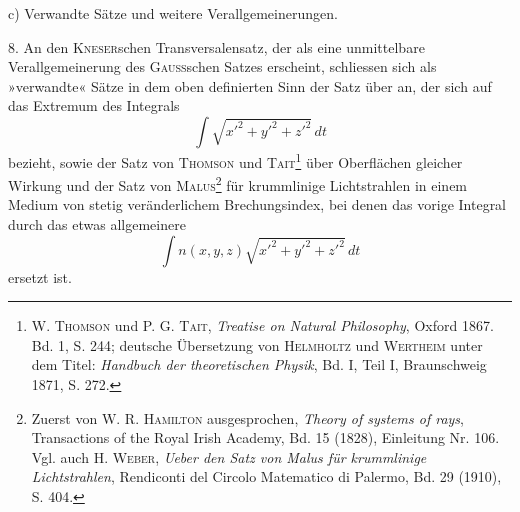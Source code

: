 \clearpage\begingroup\NoSourceHead{}
\renewcommand{\thefootnote}{\arabic{footnote})}\setcounter{footnote}{7}
\newcommand{\BolzaEqualAboveLess}{\mathrel{\vcenter{\offinterlineskip\hbox{$\scriptstyle=$}\kern-.15ex\hbox{$<$}}}}
\noindent\hspace*{\parindent}c) Verwandte Sätze und weitere Verallgemeinerungen.
\par\noindent\hspace*{\parindent}8. An den \textsc{Kneser}schen Transversalensatz, der als eine unmittelbare Verallgemeinerung
des \textsc{Gauss}schen Satzes erscheint, schliessen sich als »verwandte«
Sätze in dem oben definierten Sinn der Satz über  an, der
sich auf das Extremum des Integrals
\begin{equation*}\tag{18}
\int\sqrt{x'^2+y'^2+z'^2}\,dt
\end{equation*}
bezieht, sowie der Satz von \textsc{Thomson} und \textsc{Tait}\footnote{W. \textsc{Thomson} und P. G. \textsc{Tait}, \textit{Treatise on Natural Philosophy}, Oxford 1867. Bd. 1, S. 244;
deutsche Übersetzung von \textsc{Helmholtz} und \textsc{Wertheim} unter dem Titel: \textit{Handbuch der theoretischen Physik},
Bd. I, Teil I, Braunschweig 1871, S. 272.} über Oberflächen gleicher
\clearpage{}
\noindent Wirkung und der Satz von \textsc{Malus}\footnote{Zuerst von W. R. \textsc{Hamilton} ausgesprochen, \textit{Theory of systems of rays}, Transactions of the Royal
Irish Academy, Bd. 15 (1828), Einleitung Nr. 106. Vgl. auch H. \textsc{Weber}, \textit{Ueber den Satz von Malus für
krummlinige Lichtstrahlen}, Rendiconti del Circolo Matematico di Palermo, Bd. 29 (1910), S. 404.} für krummlinige Lichtstrahlen in einem
Medium von stetig veränderlichem Brechungsindex, bei denen das vorige Integral
durch das etwas allgemeinere
\[
\int n(x,y,z)\sqrt{x'^2+y'^2+z'^2}\,dt
\]
ersetzt ist.

